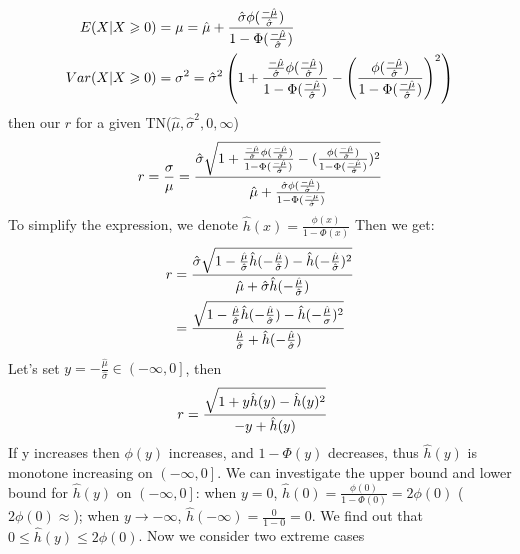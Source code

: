 \begin{equation}\notag
	\begin{split}
	E(X | X \geqslant 0)& = \mu =  \hat{\mu} + \frac{\hat{\sigma} \phi(\frac{-\hat{\mu}}{\hat{\sigma}})}{1 - \Phi(\frac{-\hat{\mu} }{\hat{\sigma}})}\\
	Var( X | X \geqslant 0) &= \sigma^2 = \hat{\sigma}^2 \left(1+\frac{\frac{-\hat{\mu}}{\hat{\sigma}} \phi(\frac{-\hat{\mu}}{\hat{\sigma}})}{1 - \Phi(\frac{-\hat{\mu}}{\hat{\sigma}})}-\left(\frac{ \phi(\frac{-\hat{\mu}}{\hat{\sigma}})}{1 - \Phi(\frac{-\hat{\mu}}{\hat{\sigma}})}\right)^2\right)
	\end{split}
\end{equation}
then our $r$ for a given TN($\hat{\mu}, \hat{\sigma}^2, 0,\infty$)
\begin{equation}\notag
	r = \frac{\sigma}{\mu} =  \frac{\hat{\sigma} \sqrt{ 1+\frac{\frac{-\hat{\mu}}{\hat{\sigma}} \phi(\frac{-\hat{\mu}}{\hat{\sigma}})}{1 - \Phi(\frac{-\hat{\mu}}{\hat{\sigma}})}-(\frac{ \phi(\frac{-\hat{\mu}}{\hat{\sigma}})}{1 - \Phi(\frac{-\hat{\mu}}{\hat{\sigma}})})^2}}{  \hat{\mu} + \frac{\hat{\sigma} \phi(\frac{-\hat{\mu}}{\hat{\sigma}})}{1 - \Phi(\frac{-\mu}{\hat{\sigma}})}}
\end{equation}
To simplify the expression, we denote $\hat{h}(x) = \frac{\phi(x)}{1 - \Phi(x)}$
Then we get:
\begin{equation}\notag
	\begin{split}
		r &= \frac{\hat{\sigma} \sqrt{1-\frac{ \hat{\mu}}{\hat{\sigma}} \hat{h}(-\frac{ \hat{\mu}}{\hat{\sigma}}) -\hat{h}(-\frac{ \hat{\mu}}{\hat{\sigma}})^2}}{  \hat{\mu} + \hat{\sigma} \hat{h}(-\frac{ \hat{\mu}}{\hat{\sigma}})} \\&= \frac{ \sqrt{1-\frac{ \hat{\mu}}{\hat{\sigma}} \hat{h}(-\frac{ \hat{\mu}}{\hat{\sigma}}) -\hat{h}(-\frac{ \hat{\mu}}{\sigma})^2}}{ \frac{ \hat{\mu}}{\hat{\sigma}} + \hat{h}(-\frac{ \hat{\mu}}{\hat{\sigma}})} 
	\end{split}
\end{equation} 
Let's set $y = -\frac{ \hat{\mu}}{\hat{\sigma}} \in \left(-\infty, 0 \right]$, then
\begin{equation}\notag
	\begin{split}
		r &= \frac{ \sqrt{1+y\hat{h}(y) -\hat{h}(y)^2}}{ -y + \hat{h}(y)} 
	\end{split}
\end{equation} 
If y increases then $\phi(y)$ increases, and $1 - \Phi(y)$ decreases, thus $\hat{h}(y)$ is monotone increasing on $ \left(-\infty, 0 \right]$. We can investigate the upper bound and lower bound for  $\hat{h}(y)$ on $\left(-\infty, 0 \right]$: when $y= 0$, $\hat{h}(0) =  \frac{\phi(0)}{1 - \Phi(0)} = 2\phi(0)$ ($2\phi(0) \approx $); when $y \to -\infty$, $\hat{h}(-\infty) =  \frac{0}{1 - 0} = 0$. We find out that $0 \leqslant \hat{h}(y) \leqslant 2\phi(0)$. Now we consider two extreme cases
